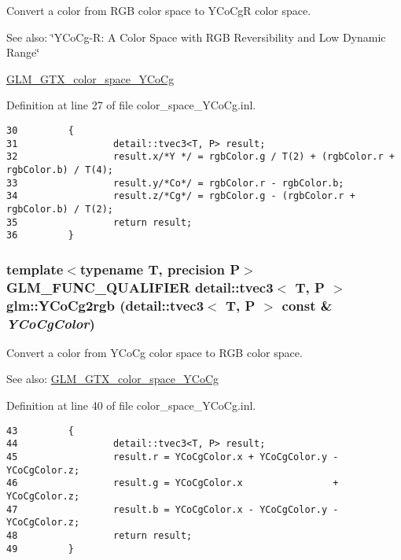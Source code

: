Convert a color from RGB color space to YCoCgR color space. \begin{Desc}
\item[See also:]\char`\"{}YCoCg-R: A Color Space with RGB Reversibility and Low Dynamic Range\char`\"{} 

\hyperlink{group__gtx__color__space___y_co_cg}{GLM\_\-GTX\_\-color\_\-space\_\-YCoCg} \end{Desc}


Definition at line 27 of file color\_\-space\_\-YCoCg.inl.

\begin{Code}\begin{verbatim}30         {
31                 detail::tvec3<T, P> result;
32                 result.x/*Y */ = rgbColor.g / T(2) + (rgbColor.r + rgbColor.b) / T(4);
33                 result.y/*Co*/ = rgbColor.r - rgbColor.b;
34                 result.z/*Cg*/ = rgbColor.g - (rgbColor.r + rgbColor.b) / T(2);
35                 return result;
36         }
\end{verbatim}
\end{Code}


\hypertarget{group__gtx__color__space___y_co_cg_g68b8a9930f61718c6e819245e04f52a1}{
\subsubsection[YCoCg2rgb]{\setlength{\rightskip}{0pt plus 5cm}template$<$typename T, precision P$>$ GLM\_\-FUNC\_\-QUALIFIER detail::tvec3$<$ T, P $>$ glm::YCoCg2rgb (detail::tvec3$<$ T, P $>$ const \& {\em YCoCgColor})}}
\label{group__gtx__color__space___y_co_cg_g68b8a9930f61718c6e819245e04f52a1}


Convert a color from YCoCg color space to RGB color space. \begin{Desc}
\item[See also:]\hyperlink{group__gtx__color__space___y_co_cg}{GLM\_\-GTX\_\-color\_\-space\_\-YCoCg} \end{Desc}


Definition at line 40 of file color\_\-space\_\-YCoCg.inl.

\begin{Code}\begin{verbatim}43         {
44                 detail::tvec3<T, P> result;
45                 result.r = YCoCgColor.x + YCoCgColor.y - YCoCgColor.z;
46                 result.g = YCoCgColor.x                + YCoCgColor.z;
47                 result.b = YCoCgColor.x - YCoCgColor.y - YCoCgColor.z;
48                 return result;
49         }
\end{verbatim}
\end{Code}


